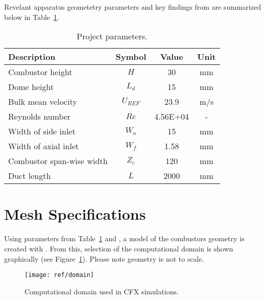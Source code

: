 Revelant apparatus geometetry parameters and key findings from \cite{art} are summarized below in Table~\ref{tab:param}.
\begin{table}[H]
	\centering
	\caption[Project parameters.]{Project parameters.\cite{art}}
	\begin{tabular}{lccc}
		\toprule
		\textbf{Description}      & \textbf{Symbol} & \textbf{Value} & \textbf{Unit} \\
		\midrule
		Combustor height          & $H$             & 30             & mm            \\
		Dome height               & $L_d$           & 15             & mm            \\
		Bulk mean velocity        & $U_{REF}$       & 23.9           & m/s           \\
		Reynolds number           & $Re$            & 4.56E+04       & -             \\
		Width of side inlet       & $W_a$           & 15             & mm            \\
		Width of axial inlet      & $W_f$           & 1.58           & mm            \\
		Combustor span-wise width & $Z_c$           & 120            & mm            \\
		Duct length               & $L$             & 2000           & mm            \\
		\bottomrule
	\end{tabular}
	\label{tab:param}
\end{table}

\section{Mesh Specifications}
\label{sec:pre_mesh}

Using parameters from Table~\ref{tab:param} and \cite{projfaq}, a model of the combustors geometry is created with \cite{sld}. From this, selection of the computational domain is shown graphically (see Figure~\ref{fig:domain}). Please note geometry is not to scale.
\begin{figure}[H]
	\centering
	\texttt{[image: ref/domain]}
	\caption[Computational domain used in CFX simulations.]{Computational domain used in CFX simulations. \cite{sld}}
	\label{fig:domain}
\end{figure}

